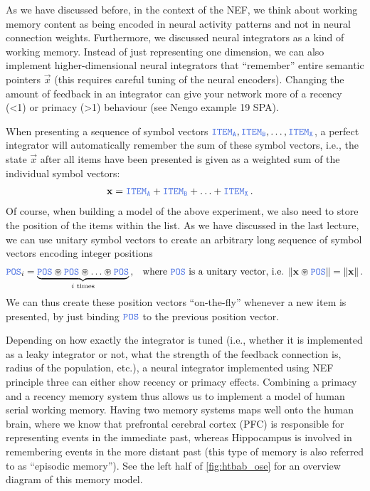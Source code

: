 \documentclass[10pt,letterpaper,oneside]{article}
\newcommand{\Obj}[1]{\ensuremath{\mathtt{\textcolor{RoyalBlue}{#1}}}}
\newcommand{\CC}{\circledast}
\begin{document}
As we have discussed before, in the context of the NEF, we think about working memory content as being encoded in neural activity patterns and not in neural connection weights. Furthermore, we discussed neural integrators as a kind of working memory. Instead of just representing one dimension, we can also implement higher-dimensional neural integrators that \enquote{remember} entire semantic pointers $\vec x$ (this requires careful tuning of the neural encoders). Changing the amount of feedback in an integrator can give your network more of a recency (<1) or primacy (>1) behaviour (see Nengo example 19 SPA).

When presenting a sequence of symbol vectors $\Obj{ITEM_A}, \Obj{ITEM_B}, \ldots, \Obj{ITEM_X}$, a perfect integrator will automatically remember the sum of these symbol vectors, i.e., the state $\vec x$ after all items have been presented is given as a weighted sum of the individual symbol vectors:
\begin{align*}
	\vec x &= \Obj{ITEM_A} + \Obj{ITEM_B} + \ldots + \Obj{ITEM_X} \,.
\end{align*}
Of course, when building a model of the above experiment, we also need to store the position of the items within the list. As we have discussed in the last lecture, we can use unitary symbol vectors to create an arbitrary long sequence of symbol vectors encoding integer positions
\begin{align*}
	\Obj{POS}_i &= \underbrace{\Obj{POS} \CC \Obj{POS} \CC \ldots \CC \Obj{POS}}_{i \text{ times}} \,, & \text{where } \Obj{POS} \text { is a unitary vector, i.e. } \| \vec x \CC \Obj{POS} \| = \| \vec x \| \,.
\end{align*}
We can thus create these position vectors \enquote{on-the-fly} whenever a new item is presented, by just binding \Obj{POS} to the previous position vector.

Depending on how exactly the integrator is tuned (i.e., whether it is implemented as a leaky integrator or not, what the strength of the feedback connection is, radius of the population, etc.), a neural integrator implemented using NEF principle three can either show recency or primacy effects. Combining a primacy and a recency memory system thus allows us to implement a model of human serial working memory. Having two memory systems maps well onto the human brain, where we know that prefrontal cerebral cortex (PFC) is responsible for representing events in the immediate past, whereas Hippocampus is involved in remembering events in the more distant past (this type of memory is also referred to as \enquote{episodic memory}). See the left half of \cref{fig:htbab_ose} for an overview diagram of this memory model.
\end{document}
